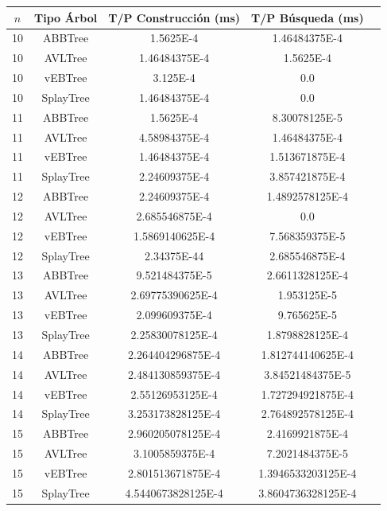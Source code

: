 \documentclass[letterpaper,12pt]{article}
\begin{document}
\begin{tabular}{|c|c|c|c|c|}
\hline
\textbf{$n$} & \textbf{Tipo Árbol} & \textbf{T/P Construcción (ms)} & \textbf{T/P Búsqueda (ms)} \\
\hline
10 & ABBTree & 1.5625E-4 & 1.46484375E-4 \\
\hline
10 & AVLTree & 1.46484375E-4 & 1.5625E-4 \\
\hline
10 & vEBTree & 3.125E-4 & 0.0\\
\hline
10 & SplayTree & 1.46484375E-4 & 0.0 \\
\hline
\hline
11 & ABBTree & 1.5625E-4 & 8.30078125E-5 \\
\hline
11 & AVLTree & 4.58984375E-4 & 1.46484375E-4 \\
\hline
11 & vEBTree & 1.46484375E-4 & 1.513671875E-4\\
\hline
11 & SplayTree & 2.24609375E-4 & 3.857421875E-4 \\
\hline
\hline
12 & ABBTree & 2.24609375E-4 & 1.4892578125E-4  \\
\hline
12 & AVLTree & 2.685546875E-4 & 0.0 \\
\hline
12 & vEBTree & 1.5869140625E-4 & 7.568359375E-5\\
\hline
12 & SplayTree & 2.34375E-44 & 2.685546875E-4 \\
\hline
\hline
13 & ABBTree & 9.521484375E-5 & 2.6611328125E-4  \\
\hline
13 & AVLTree & 2.69775390625E-4 & 1.953125E-5 \\
\hline
13 & vEBTree & 2.099609375E-4 & 9.765625E-5\\
\hline
13 & SplayTree & 2.25830078125E-4 & 1.8798828125E-4 \\
\hline
\hline
14 & ABBTree & 2.264404296875E-4 & 1.812744140625E-4 \\
\hline
14 & AVLTree & 2.484130859375E-4 & 3.84521484375E-5 \\
\hline
14 & vEBTree & 2.55126953125E-4 & 1.727294921875E-4\\
\hline
14 & SplayTree & 3.253173828125E-4 & 2.764892578125E-4 \\
\hline
\hline
15 & ABBTree & 2.960205078125E-4 & 2.4169921875E-4 \\
\hline
15 & AVLTree & 3.1005859375E-4 & 7.2021484375E-5 \\
\hline
15 & vEBTree & 2.801513671875E-4  & 1.3946533203125E-4\\
\hline
15 & SplayTree & 4.5440673828125E-4 & 3.8604736328125E-4 \\
\hline
\end{tabular}
\end{document}
